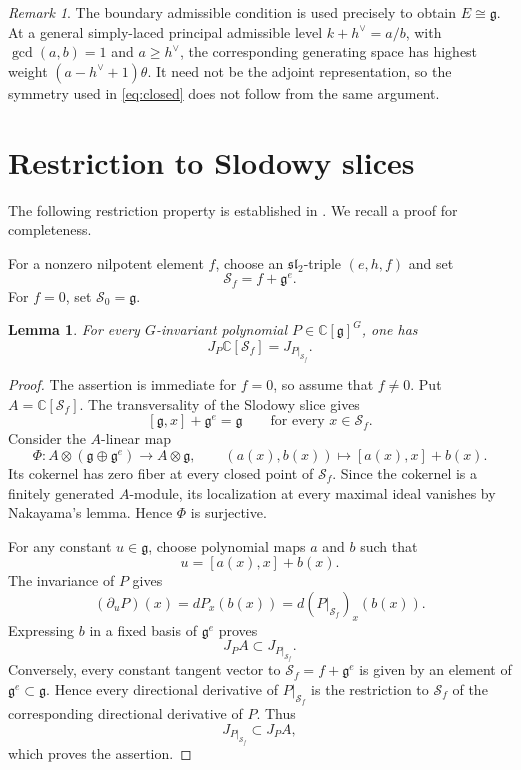 \documentclass[11pt,reqno]{amsart}
\newtheorem{lemma}[theorem]{Lemma}
\theoremstyle{remark}
\newtheorem{remark}[theorem]{Remark}
\newcommand{\g}{\mathfrak g}
\newcommand{\C}{\mathbb C}
\begin{document}
\begin{remark}
The boundary admissible condition is used precisely to obtain
$E\cong\g$. At a general simply-laced principal admissible level
$k+h^\vee=a/b$, with $\gcd(a,b)=1$ and $a\geq h^\vee$, the
corresponding generating space has highest weight
$(a-h^\vee+1)\theta$. It need not be the adjoint representation, so
the symmetry used in \eqref{eq:closed} does not follow from the same
argument.
\end{remark}

\section{Restriction to Slodowy slices}\label{sec:slices}
The following restriction property is established in
\cite[Theorem~1.4]{Kang}. We recall a proof for completeness.



For a nonzero nilpotent element $f$, choose an
$\mathfrak{sl}_2$-triple $(e,h,f)$ and set
\[
\mathcal S_f=f+\g^e.
\]
For $f=0$, set $\mathcal S_0=\g$.

\begin{lemma}\label{lem:slice}
For every $G$-invariant polynomial $P\in\C[\g]^G$, one has
\[
J_P\C[\mathcal S_f]
=
J_{P|_{\mathcal S_f}}.
\]
\end{lemma}

\begin{proof}
The assertion is immediate for $f=0$, so assume that $f\neq0$.
Put $A=\C[\mathcal S_f]$. The transversality of the Slodowy slice
gives
\[
[\g,x]+\g^e=\g
\qquad
\text{for every }x\in\mathcal S_f.
\]
Consider the $A$-linear map
\[
\Phi:A\otimes(\g\oplus\g^e)\longrightarrow A\otimes\g,
\qquad
(a(x),b(x))\longmapsto[a(x),x]+b(x).
\]
Its cokernel has zero fiber at every closed point of
$\mathcal S_f$. Since the cokernel is a finitely generated
$A$-module, its localization at every maximal ideal vanishes by
Nakayama's lemma. Hence $\Phi$ is surjective.

For any constant $u\in\g$, choose polynomial maps $a$ and $b$ such
that
\[
u=[a(x),x]+b(x).
\]
The invariance of $P$ gives
\[
(\partial_uP)(x)
=
dP_x(b(x))
=
d(P|_{\mathcal S_f})_x(b(x)).
\]
Expressing $b$ in a fixed basis of $\g^e$ proves
\[
J_PA\subset J_{P|_{\mathcal S_f}}.
\]
Conversely, every constant tangent vector to
$\mathcal S_f=f+\g^e$ is given by an element of $\g^e\subset\g$.
Hence every directional derivative of $P|_{\mathcal S_f}$ is the
restriction to $\mathcal S_f$ of the corresponding directional
derivative of $P$. Thus
\[
J_{P|_{\mathcal S_f}}\subset J_PA,
\]
which proves the assertion.
\end{proof}
\end{document}
